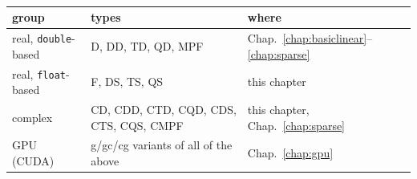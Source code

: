 \section{}

\begin{table}[h]
\centering
\begin{tabular}{l l l}
\hline
group & types & where \\
\hline
real, \texttt{double}-based & D, DD, TD, QD, MPF & Chap.\ \ref{chap:basiclinear}--\ref{chap:sparse} \\
real, \texttt{float}-based  & F, DS, TS, QS      & this chapter \\
complex                     & CD, CDD, CTD, CQD, CDS, CTS, CQS, CMPF & this chapter, Chap.\ \ref{chap:sparse} \\
GPU (CUDA)                  & g/gc/cg variants of all of the above   & Chap.\ \ref{chap:gpu} \\
\hline
\end{tabular}
\caption{}
\end{table}
